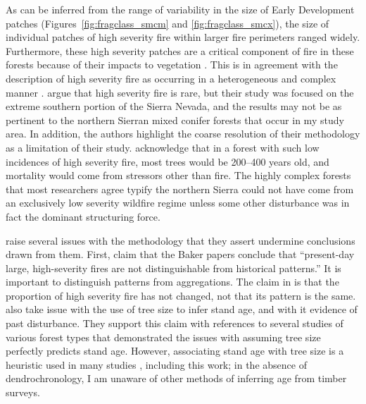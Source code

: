As can be inferred from the range of variability in the size of Early Development patches (Figures~\ref{fig:fragclass_smcm} and \ref{fig:fragclass_smcx}), the size of individual patches of high severity fire within larger fire perimeters ranged widely. Furthermore, these high severity patches are a critical component of fire in these forests because of their impacts to vegetation \citep{Collins2010}. This is in agreement with the description of high severity fire as occurring in a heterogeneous and complex manner \citep{Keeley2000,Hessburg2005,Collins2010,Baker2014}. \citet{Stephens2015} argue that high severity fire is rare, but their study was focused on the extreme southern portion of the Sierra Nevada, and the results may not be as pertinent to the northern Sierran mixed conifer forests that occur in my study area. In addition, the authors highlight the coarse resolution of their methodology as a limitation of their study. \citet{Stephens2015} acknowledge that in a forest with such low incidences of high severity fire, most trees would be 200--400 years old, and mortality would come from stressors other than fire. The highly complex forests that most researchers agree typify the northern Sierra \citep{Chang1995} could not have come from an exclusively low severity wildfire regime unless some other disturbance was in fact the dominant structuring force.

\citet{Fule2014} raise several issues with the \citet{Baker2014} methodology that they assert undermine conclusions drawn from them. First, \citet{Fule2014} claim that the Baker papers \citep{Baker2012,Baker2014} conclude that ``present-day large, high-severity fires are not distinguishable from historical patterns.'' It is important to distinguish patterns from aggregations. The claim in \citet{Baker2012} is that the proportion of high severity fire has not changed, not that its pattern is the same. \citet{Fule2014} also take issue with the use of tree size to infer stand age, and with it evidence of past disturbance. They support this claim with references to several studies of various forest types that demonstrated the issues with assuming tree size perfectly predicts stand age. However, associating stand age with tree size is a heuristic used in many studies \citep{WHR1988,Landfire2007,USDAForestService2009}, including this work; in the absence of dendrochronology, I am unaware of other methods of inferring age from timber surveys.

